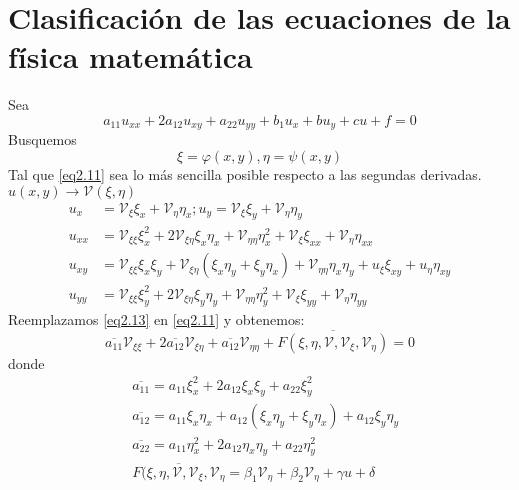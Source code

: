 \documentclass[../main]{subfiles}
\begin{document}
\section{Clasificación de las ecuaciones de la física matemática}
Sea 
\begin{equation}
    a_{11}u_{xx}+2a_{12}u_{xy}+a_{22}u_{yy}+b_{1}u_x+bu_y+cu+f=0
    \label{eq2.11}
\end{equation}
Busquemos 
\begin{equation}
    \xi=\varphi(x,y), \eta=\psi(x,y)
\end{equation}
Tal que \eqref{eq2.11} sea lo más sencilla posible respecto a las segundas derivadas. $u(x,y)\rightarrow \mathcal{V}(\xi, \eta)$
\begin{equation}
    \begin{split}
        u_{x}&=\mathcal{V}_{\xi}\xi_x+\mathcal{V}_{\eta}\eta_x; u_y=\mathcal{V}_{\xi}\xi_y+\mathcal{V}_{\eta}\eta_y \\
        u_{xx}&=\mathcal{V}_{\xi\xi}\xi^2_x+2\mathcal{V}_{\xi\eta}\xi_x\eta_x+\mathcal{V}_{\eta\eta}\eta^2_x+\mathcal{V}_{\xi}\xi_{xx}+\mathcal{V}_{\eta}\eta_{xx} \\
        u_{xy}&=\mathcal{V}_{\xi\xi}\xi_x\xi_y+\mathcal{V}_{\xi\eta}(\xi_x\eta_y+\xi_y\eta_x)+\mathcal{V}_{\eta\eta}\eta_x\eta_y+u_{\xi}\xi_{xy}+u_{\eta}\eta_{xy}\\
        u_{yy}&=\mathcal{V}_{\xi\xi}\xi^2_y+2\mathcal{V}_{\xi\eta}\xi_y\eta_y+\mathcal{V}_{\eta\eta}\eta^2_y+\mathcal{V}_{\xi}\xi_{yy}+\mathcal{V}_{\eta}\eta_{yy}
        \label{eq2.13}
    \end{split}
\end{equation}
Reemplazamos \eqref{eq2.13} en \eqref{eq2.11} y obtenemos:
\begin{equation}
    \overline{a_{11}}\mathcal{V}_{\xi\xi}+2\overline{a_{12}}\mathcal{V}_{\xi\eta}+\overline{a_{12}}\mathcal{V}_{\eta\eta}+\overline{F(\xi, \eta, \mathcal{V}, \mathcal{V}_{\xi}, \mathcal{V}_{\eta})}=0
\end{equation}
donde
\begin{align*}
    &\overline{a_{11}}=a_{11}\xi^2_x+2a_{12}\xi_x\xi_y+a_{22}\xi^2_y \\
    &\overline{a_{12}}=a_{11}\xi_x\eta_x+a_{12}(\xi_x\eta_y+\xi_y\eta_x)+a_{12}\xi_y\eta_y \\
    &\overline{a_{22}}=a_{11}\eta^2_x+2a_{12}\eta_x\eta_y+a_{22}\eta^2_y \\
    &\overline{F(\xi, \eta, \mathcal{V}, \mathcal{V}_{\xi}, \mathcal{V}_{\eta}}=\beta_1 \mathcal{V}_{\eta}+\beta_2 \mathcal{V}_{\eta}+\gamma u+\delta
\end{align*}
\end{document}
